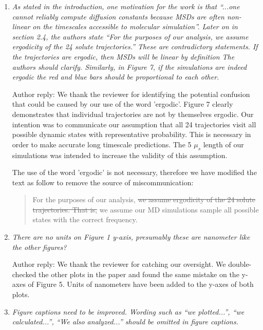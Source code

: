 \documentclass{article}
\begin{document}
\begin{enumerate}[label={Comment \theenumi :}, leftmargin=3.9\parindent]
    \item \textit{As stated in the introduction, one motivation for the work is that “...one 
    cannot reliably compute diffusion constants because MSDs are often non-linear on the timescales
    accessible to molecular simulation”. Later on in section 2.4, the authors state “For the 
    purposes of our analysis, we assume ergodicity of the 24 solute trajectories.” These are 
    contradictory statements. If the trajectories are ergodic, then MSDs will be linear by 
    definition The authors should clarify. Similarly, in Figure 7, if the simulations are indeed 
    ergodic the red and blue bars should be proportional to each other.}
    
    Author reply: We thank the reviewer for identifying the potential confusion that could be
    caused by our use of the word 'ergodic'. Figure 7 clearly demonstrates that individual trajectories
    are not by themselves ergodic. Our intention was to communicate our assumption that all 24 
    trajectories visit all possible dynamic states with representative probability. This is 
    necessary in order to make accurate long timescale predictions. The 5 $\mu_s$ length of our 
    simulations was intended to increase the validity of this assumption. 
    
    The use of the word 'ergodic' is not necessary, therefore we have modified the text as follow
    to remove the source of miscommunication:
    
    \begin{quote}
    For the purposes of our analysis, \sout{we assume ergodicity of the 24 solute trajectories. That is,}
    we assume our MD simulations sample all possible states with the correct frequency.
    \end{quote}    
    
    \item \textit{There are no units on Figure 1 y-axis, presumably these are nanometer like the 
    other figures?}
    
    Author reply: We thank the reviewer for catching our oversight. We double-checked the 
    other plots in the paper and found the same mistake on the y-axes of Figure 5. Units of nanometers
    have been added to the y-axes of both plots.
    
    \item \textit{Figure captions need to be improved. Wording such as “we plotted...”, “we 
    calculated...”, “We also analyzed...” should be omitted in figure captions.}  
		  
  \end{enumerate}
\end{document}
